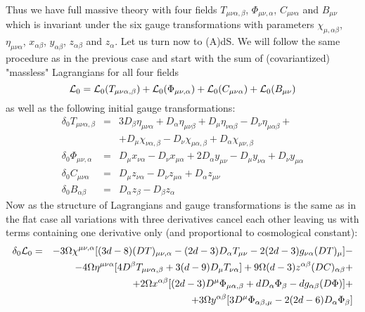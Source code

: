 \documentclass[a4paper,12pt]{article}
\begin{document}
Thus we have full massive theory with four fields $T_{\mu\nu\alpha,\beta}$,
$\Phi_{\mu\nu,\alpha}$, $C_{\mu\nu\alpha}$ and $B_{\mu\nu}$ which is
invariant under the six gauge transformations with parameters
$\chi_{\mu,\alpha\beta}$, $\eta_{\mu\nu\alpha}$, $x_{\alpha\beta}$,
$y_{\alpha\beta}$, $z_{\alpha\beta}$ and $z_\alpha$. Let us turn now
to (A)dS. We will follow the same procedure as in the previous case
and start with the sum of (covariantized) "massless" Lagrangians
for all four fields
$$
{\cal L}_0 = {\cal L}_0 (T_{\mu\nu\alpha,\beta}) +
{\cal L}_0 (\Phi_{\mu\nu,\alpha}) + {\cal L}_0 (C_{\mu\nu\alpha}) +
{\cal L}_0 (B_{\mu\nu})
$$
as well as the following initial gauge transformations:
\begin{eqnarray}
\delta_0 T_{\mu\nu\alpha,\beta} &=& 3 D_\beta \eta_{\mu\nu\alpha}
+ D_\alpha \eta_{\mu\nu\beta} + D_\mu \eta_{\nu\alpha\beta}
- D_\nu \eta_{\mu\alpha\beta} + \nonumber \\
 && + D_\mu \chi_{\nu\alpha,\beta} - D_\nu
\chi_{\mu\alpha,\beta} + D_\alpha \chi_{\mu\nu,\beta} \nonumber \\
\delta_0 \Phi_{\mu\nu,\alpha} &=& D_\mu x_{\nu\alpha} - D_\nu
x_{\mu\alpha} + 2 D_\alpha y_{\mu\nu} - D_\mu y_{\nu\alpha}
+ D_\nu y_{\mu\alpha} \\
\delta_0 C_{\mu\nu\alpha} &=& D_\mu z_{\nu\alpha} - D_\nu
z_{\mu\alpha} + D_\alpha z_{\mu\nu} \nonumber \\
\delta_0 B_{\alpha\beta} &=& D_\alpha z_\beta - D_\beta z_\alpha
\nonumber
\end{eqnarray}
Now as the structure of Lagrangians and gauge transformations is the
same as in the flat case all variations with three derivatives
cancel each other leaving us with terms containing one derivative
only (and proportional to cosmological constant):
\begin{eqnarray}
\delta_0 {\cal L}_0 &=& - 3 \Omega \chi^{\mu\nu,\alpha} [ (3d-8)
(D T)_{\mu\nu,\alpha} - (2d-3) D_\alpha T_{\mu\nu} - 2(2d-3) g_{\nu\alpha}
(D T)_\mu ] - \nonumber \\
 && - 4 \Omega \eta^{\mu\nu\alpha} [ 4 D^\beta T_{\mu\nu\alpha,\beta}
 + 3(d-9) D_\mu T_{\nu\alpha} ] + 9 \Omega (d-3) z^{\alpha\beta}
 (D C)_{\alpha\beta} + \nonumber \\
 && + 2 \Omega x^{\alpha\beta} [ (2d-3) D^\mu \Phi_{\mu\alpha,\beta}
 + d D_\alpha \Phi_\beta - d g_{\alpha\beta} (D \Phi) ] + \nonumber \\
 && + 3 \Omega y^{\alpha\beta} [ 3 D^\mu \Phi_{\alpha\beta,\mu} - 2 (2d-6)
 D_\alpha \Phi_\beta ]
\end{eqnarray}
\end{document}
